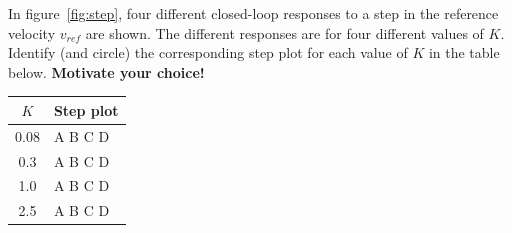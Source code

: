 \documentclass[letter,11pt]{scrartcl}
\begin{document}
In figure~\ref{fig:step}, four different closed-loop responses to a step in the reference velocity $v_{ref}$ are shown. The different responses are for four different values of $K$. Identify (and circle) the corresponding step plot for each value of $K$ in the table below. \textbf{Motivate your choice!}

\begin{center}
\begin{tabular}{cl}
\(K\) & Step plot\\\hline
0.08 & A\hspace*{2mm} B\hspace*{2mm} C\hspace*{2mm} D\\
0.3 & A\hspace*{2mm}  B\hspace*{2mm}  C\hspace*{2mm} D\\
1.0 & A\hspace*{2mm} B\hspace*{2mm}  C\hspace*{2mm} D\\
2.5 & A\hspace*{2mm} B\hspace*{2mm}  C\hspace*{2mm} D\\ \hline
\end{tabular}
\end{center}
\end{document}
